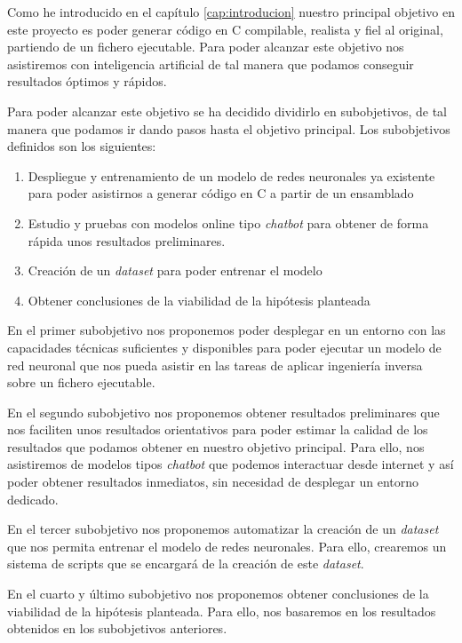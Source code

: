 
Como he introducido en el capítulo \ref{cap:introducion} nuestro principal
objetivo en este proyecto es poder generar código en C compilable, realista y fiel
al original, partiendo de un fichero ejecutable. Para poder alcanzar este objetivo
nos asistiremos con inteligencia artificial de tal manera que podamos conseguir
resultados óptimos y rápidos.

Para poder alcanzar este objetivo se ha decidido dividirlo en subobjetivos, de tal
manera que podamos ir dando pasos hasta el objetivo principal. Los subobjetivos definidos
son los siguientes:

\begin{enumerate}
    \item Despliegue y entrenamiento de un modelo de redes neuronales ya existente para
        poder asistirnos a generar código en C a partir de un ensamblado
    \item Estudio y pruebas con modelos online tipo \textit{chatbot} para obtener de forma rápida
        unos resultados preliminares.
    \item Creación de un \textit{dataset} para poder entrenar el modelo
    \item Obtener conclusiones de la viabilidad de la hipótesis planteada
\end{enumerate}

En el primer subobjetivo nos proponemos poder desplegar en un entorno con las capacidades
técnicas suficientes y disponibles para poder ejecutar un modelo de red neuronal que nos pueda asistir en
las tareas de aplicar ingeniería inversa sobre un fichero ejecutable.

En el segundo subobjetivo nos proponemos obtener resultados preliminares que nos faciliten
unos resultados orientativos para poder estimar la calidad de los resultados que podamos
obtener en nuestro objetivo principal. Para ello, nos asistiremos de modelos tipos \textit{chatbot}
que podemos interactuar desde internet y así poder obtener resultados inmediatos, sin necesidad
de desplegar un entorno dedicado.

En el tercer subobjetivo nos proponemos automatizar la creación de un \textit{dataset} que
nos permita entrenar el modelo de redes neuronales. Para ello, crearemos un sistema de scripts
que se encargará de la creación de este \textit{dataset}.

En el cuarto y último subobjetivo nos proponemos obtener conclusiones de la viabilidad de la
hipótesis planteada. Para ello, nos basaremos en los resultados obtenidos en los subobjetivos
anteriores.

